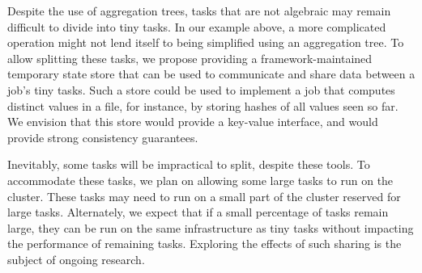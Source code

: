 Despite the use of aggregation trees, tasks that are not algebraic may remain
difficult to divide into tiny tasks. 
In our example above, a more complicated operation might not lend itself to being
simplified using an aggregation tree.
To allow splitting these tasks, we propose providing a framework-maintained
temporary state store that can be used to communicate and share data between a
job's tiny tasks. Such a store could be used to implement a job that computes
distinct values in a file, for instance, by storing hashes of all values
seen so far. We envision that this store would provide a key-value interface,
and would provide strong consistency guarantees.

Inevitably, some tasks will be impractical to split, despite these tools.
To accommodate these
tasks, we plan on allowing some large tasks to run on the cluster. These tasks
may need to run on a small part of the cluster reserved for large tasks.
Alternately, we expect that if a small percentage of tasks remain large, they
can be run on the same infrastructure as tiny tasks without impacting the
performance of remaining tasks. Exploring the effects of such sharing is
the subject of ongoing research.
